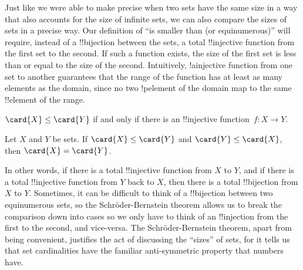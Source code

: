 \documentclass[../../include/open-logic-section]{subfiles}
\begin{document}


\begin{explain}
Just like we were able to make precise when two sets have the same
size in a way that also accounts for the size of infinite sets, we can
also compare the sizes of sets in a precise way. Our definition of
``is smaller than (or equinumerous)'' will require, instead of a
!!{bijection} between the sets, a total !!{injective} function from the first
set to the second. If such a function exists, the size of the first
set is less than or equal to the size of the second.  Intuitively, 
!a{injective} function from one set to another guarantees that the range of
the function has at least as many elements as the domain, since no two
!p{element} of the domain map to the same !!{element} of the range.
\end{explain}

\begin{defn}
$\card{X} \leq \card{Y}$ if and only if there is an !!{injective}
  function~$f \colon X \to Y$.
\end{defn}

\begin{thm}
Let $X$ and $Y$ be sets. If $\card{X} \leq \card{Y}$ and $\card{Y}
\leq \card{X}$, then $\card{X} = \card{Y}$.
\end{thm}

\begin{explain}
In other words, if there is a total !!{injective} function from $X$ to
$Y$, and if there is a total !!{injective} function from $Y$ back to $X$,
then there is a total !!{bijection} from $X$ to $Y$. Sometimes, it can be
difficult to think of a !!{bijection} between two equinumerous sets, so
the Schr\"oder-Bernstein theorem allows us to break the comparison
down into cases so we only have to think of an !!{injection} from the
first to the second, and vice-versa. The Schr\"oder-Bernstein theorem,
apart from being convenient, justifies the act of discussing the
``sizes'' of sets, for it tells us that set cardinalities have the
familiar anti-symmetric property that numbers have.
\end{explain}
\end{document}

